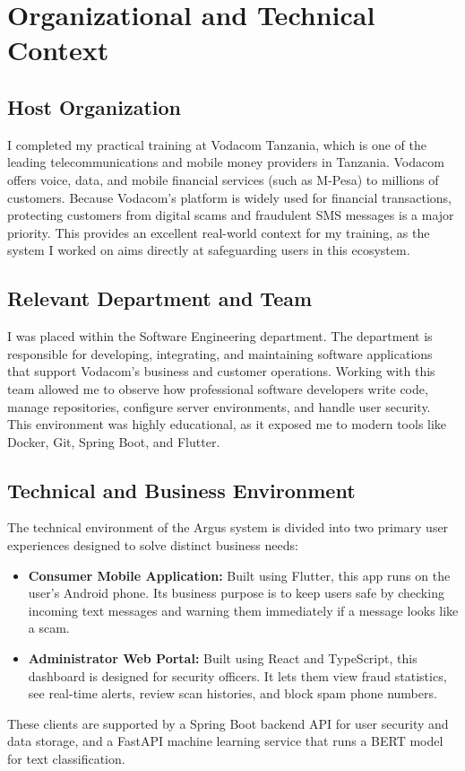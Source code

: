 \chapter{Organizational and Technical Context}
\label{ch:context}

\section{Host Organization}
I completed my practical training at Vodacom Tanzania, which is one of the leading telecommunications and mobile money providers in Tanzania. Vodacom offers voice, data, and mobile financial services (such as M-Pesa) to millions of customers. Because Vodacom's platform is widely used for financial transactions, protecting customers from digital scams and fraudulent SMS messages is a major priority. This provides an excellent real-world context for my training, as the system I worked on aims directly at safeguarding users in this ecosystem.

\section{Relevant Department and Team}
I was placed within the Software Engineering department. The department is responsible for developing, integrating, and maintaining software applications that support Vodacom's business and customer operations. Working with this team allowed me to observe how professional software developers write code, manage repositories, configure server environments, and handle user security. This environment was highly educational, as it exposed me to modern tools like Docker, Git, Spring Boot, and Flutter.

\section{Technical and Business Environment}
The technical environment of the Argus system is divided into two primary user experiences designed to solve distinct business needs:
\begin{itemize}
  \item \textbf{Consumer Mobile Application:} Built using Flutter, this app runs on the user's Android phone. Its business purpose is to keep users safe by checking incoming text messages and warning them immediately if a message looks like a scam.
  \item \textbf{Administrator Web Portal:} Built using React and TypeScript, this dashboard is designed for security officers. It lets them view fraud statistics, see real-time alerts, review scan histories, and block spam phone numbers.
\end{itemize}
These clients are supported by a Spring Boot backend API for user security and data storage, and a FastAPI machine learning service that runs a BERT model for text classification.


